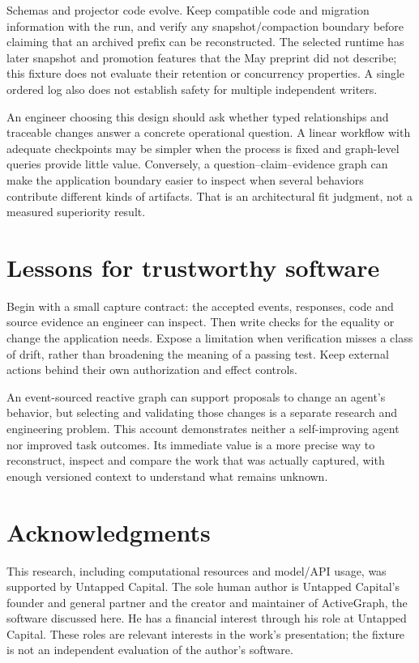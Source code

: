 \documentclass[11pt]{article}
\begin{document}
Schemas and projector code evolve. Keep compatible code and migration information with the run, and verify any snapshot/compaction boundary before claiming that an archived prefix can be reconstructed. The selected runtime has later snapshot and promotion features that the May preprint did not describe; this fixture does not evaluate their retention or concurrency properties. A single ordered log also does not establish safety for multiple independent writers.

An engineer choosing this design should ask whether typed relationships and traceable changes answer a concrete operational question. A linear workflow with adequate checkpoints may be simpler when the process is fixed and graph-level queries provide little value. Conversely, a question--claim--evidence graph can make the application boundary easier to inspect when several behaviors contribute different kinds of artifacts. That is an architectural fit judgment, not a measured superiority result.

\section*{Lessons for trustworthy software}
Begin with a small capture contract: the accepted events, responses, code and source evidence an engineer can inspect. Then write checks for the equality or change the application needs. Expose a limitation when verification misses a class of drift, rather than broadening the meaning of a passing test. Keep external actions behind their own authorization and effect controls.

An event-sourced reactive graph can support proposals to change an agent's behavior, but selecting and validating those changes is a separate research and engineering problem. This account demonstrates neither a self-improving agent nor improved task outcomes. Its immediate value is a more precise way to reconstruct, inspect and compare the work that was actually captured, with enough versioned context to understand what remains unknown.

\section*{Acknowledgments}
This research, including computational resources and model/API usage, was supported by Untapped Capital. The sole human author is Untapped Capital's founder and general partner and the creator and maintainer of ActiveGraph, the software discussed here. He has a financial interest through his role at Untapped Capital. These roles are relevant interests in the work's presentation; the fixture is not an independent evaluation of the author's software.
\end{document}
